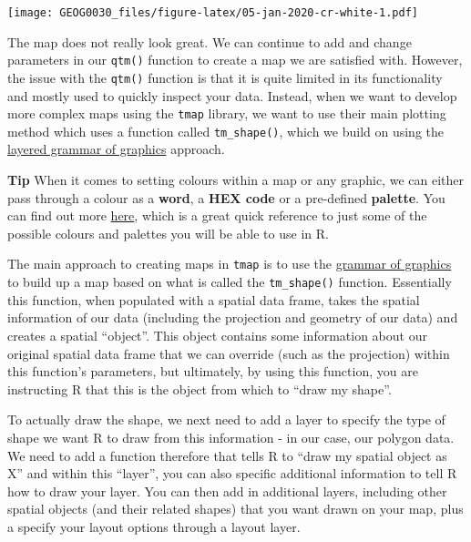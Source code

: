\documentclass[
]{book}
\begin{document}
\texttt{[image: GEOG0030\_files/figure-latex/05-jan-2020-cr-white-1.pdf]}

The map does not really look great. We can continue to add and change parameters in our \texttt{qtm()} function to create a map we are satisfied with. However, the issue with the \texttt{qtm()} function is that it is quite limited in its functionality and mostly used to quickly inspect your data. Instead, when we want to develop more complex maps using the \texttt{tmap} library, we want to use their main plotting method which uses a function called \texttt{tm\_shape()}, which we build on using the \href{https://towardsdatascience.com/a-comprehensive-guide-to-the-grammar-of-graphics-for-effective-visualization-of-multi-dimensional-1f92b4ed4149}{layered grammar of graphics} approach.

\textbf{Tip}
When it comes to setting colours within a map or any graphic, we can either pass through a colour as a \textbf{word}, a \textbf{HEX code} or a pre-defined \textbf{palette}. You can find out more \href{http://www.sthda.com/english/wiki/colors-in-r}{here}, which is a great quick reference to just some of the possible colours and palettes you will be able to use in R.

The main approach to creating maps in \texttt{tmap} is to use the \href{https://towardsdatascience.com/a-comprehensive-guide-to-the-grammar-of-graphics-for-effective-visualization-of-multi-dimensional-1f92b4ed4149}{grammar of graphics} to build up a map based on what is called the \texttt{tm\_shape()} function. Essentially this function, when populated with a spatial data frame, takes the spatial information of our data (including the projection and geometry of our data) and creates a spatial ``object''. This object contains some information about our original spatial data frame that we can override (such as the projection) within this function's parameters, but ultimately, by using this function, you are instructing R that this is the object from which to ``draw my shape''.

To actually draw the shape, we next need to add a layer to specify the type of shape we want R to draw from this information - in our case, our polygon data. We need to add a function therefore that tells R to ``draw my spatial object as X'' and within this ``layer'', you can also specific additional information to tell R how to draw your layer. You can then add in additional layers, including other spatial objects (and their related shapes) that you want drawn on your map, plus a specify your layout options through a layout layer.
\end{document}
